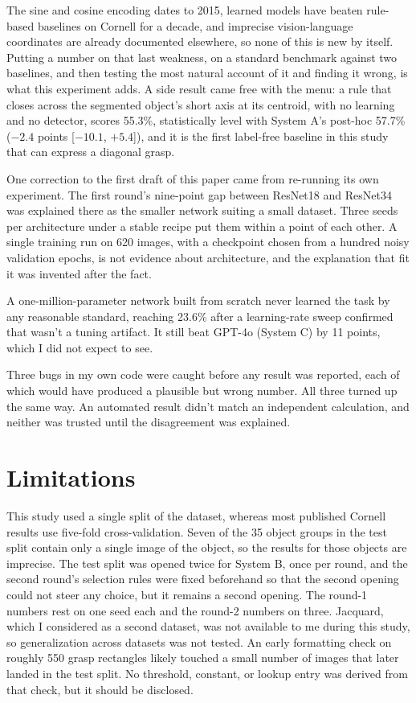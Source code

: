 \documentclass[12pt,letterpaper]{article}
\begin{document}
The sine and cosine encoding dates to 2015, learned models have beaten
rule-based baselines on Cornell for a decade, and imprecise
vision-language coordinates are already documented elsewhere, so none
of this is new by itself. Putting a number on that last weakness, on a
standard benchmark against two baselines, and then testing the most
natural account of it and finding it wrong, is what this experiment
adds. A side result came free with the menu: a rule that closes across
the segmented object's short axis at its centroid, with no learning and
no detector, scores 55.3\%, statistically level with System A's
post-hoc 57.7\% ($-2.4$ points [$-10.1$, $+5.4$]), and it is the first
label-free baseline in this study that can express a diagonal grasp.

One correction to the first draft of this paper came from re-running
its own experiment. The first round's nine-point gap between ResNet18
and ResNet34 was explained there as the smaller network suiting a small
dataset. Three seeds per architecture under a stable recipe put them
within a point of each other. A single training run on 620 images, with
a checkpoint chosen from a hundred noisy validation epochs, is not
evidence about architecture, and the explanation that fit it was
invented after the fact.

A one-million-parameter network built from scratch never learned the
task by any reasonable standard, reaching 23.6\% after a learning-rate
sweep confirmed that wasn't a tuning artifact. It still beat GPT-4o
(System C) by 11 points, which I did not expect to see.

Three bugs in my own code were caught before any result was reported,
each of which would have produced a plausible but wrong number. All
three turned up the same way. An automated result didn't match an
independent calculation, and neither was trusted until the disagreement
was explained.

\section{Limitations}

This study used a single split of the dataset, whereas most published
Cornell results use five-fold cross-validation. Seven of the 35 object groups in the
test split contain only a single image of the object, so the results for
those objects are imprecise. The test split was
opened twice for System B, once per round, and the second round's
selection rules were fixed beforehand so that the second opening could
not steer any choice, but it remains a second opening. The round-1
numbers rest on one seed each and the round-2 numbers on three. Jacquard,
which I considered as a second dataset, was not available to me during
this study, so generalization across datasets was not tested. An early formatting check on roughly 550 grasp
rectangles likely touched a small number of images that later landed in
the test split. No threshold, constant, or lookup entry was derived
from that check, but it should be disclosed.
\end{document}
